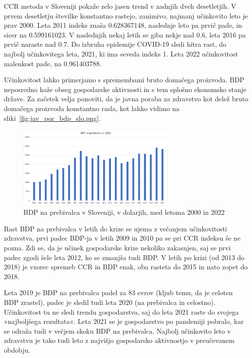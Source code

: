 \documentclass[12pt,a4paper]{article}
\theoremstyle{definition}
\begin{document}
  CCR metoda v Sloveniji pokaže zelo jasen trend v zadnjih dveh desetletjih. 
  V prvem desetletju številke konstantno rastejo, zanimivo, najmanj učinkovito leto je prav 2000. 
  Leta 2011 indeks znaša 0.628367148, naslednje leto pa prvič pade, in sicer na 0.599161023.  
  V naslednjih nekaj letih se giba nekje nad 0.6, leta 2016 pa prvič naraste nad 0.7. 
  Do izbruha epidemije COVID-19 sledi hitra rast, do najbolj učinkovitega leta, 2021, ki ima seveda indeks 1. 
  Leta 2022 učinkovitost malenkost pade, na 0.961403788.

  Učinkovitost lahko primerjamo s spremembami bruto domačega proizvoda. 
  BDP neposredno kaže obseg gospodarske aktivnosti in s tem splošno ekonomsko stanje države. 
  Za začetek velja ponoviti, da je javna poraba za zdravstvo kot delež bruto domačega proizvoda konstantno rasla, kot lahko vidimo na sliki~\ref{fig:jav_por_bdp_slo.png}. %

\begin{figure}[H]
    \centering
    \includegraphics[width=0.7\textwidth]{bnp_pbr_slo.png}
    \caption{BDP na prebivalca v Sloveniji, v dolarjih, med letoma 2000 in 2022}
    \label{fig:bnp_pbr_slo.png}
\end{figure}

Rast BDP na prebivalca v letih do krize se ujema z večanjem učinkovitosti zdravstva, prvi padec BDP-ja v letih 2009 in 2010 pa se pri CCR indeksu še ne pozna. 
Zdi se, da je učinek gospodarske krize nekoliko zakasnjen, saj se prvi padec zgodi šele leta 2012, ko se zmanjša tudi BDP. 
V letih po krizi (od 2013 do 2018) je vzorec spremeb CCR in BDP enak, oba rasteta do 2015 in nato zopet do 2018. 

Leta 2019 je BDP na prebivalca padel za 83 evrov (kljub temu, da je celoten BDP zrastel), padec je sledil tudi leta 2020 (na prebivalca in celostno). 
Učinkovitost tu ne sledi trendu gospodarstva, saj do leta 2021 raste do svojega »najboljšega rezultata«. 
Leta 2021 se je gospodarstvo po pandemiji pobralo, kar se odraža tudi v večjem skoku BDP na prebivalca. 
Najbolj učinkovito leto v zdravstvu je tako tudi leto z najvišjo gospodarsko aktivnostjo v preučevanem obdobju.
\end{document}

